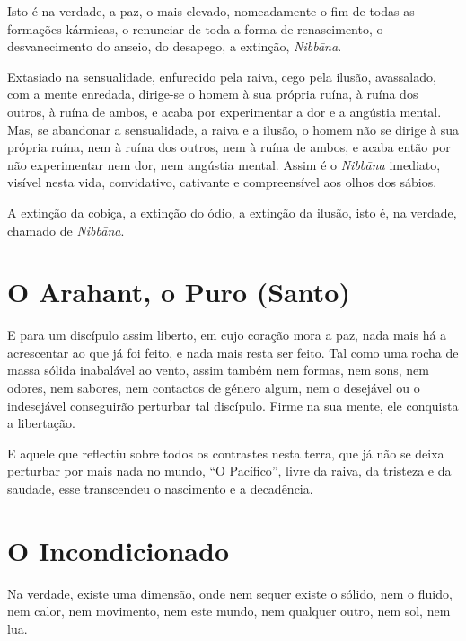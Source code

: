 Isto é na verdade, a paz, o mais elevado, nomeadamente o fim de todas as
formações kármicas, o renunciar de toda a forma de renascimento, o
desvanecimento do anseio, do desapego, a extinção, \emph{Nibbāna}.


Extasiado na sensualidade, enfurecido pela raiva, cego pela ilusão, avassalado,
com a mente enredada, dirige-se o homem à sua própria ruína, à ruína dos outros,
à ruína de ambos, e acaba por experimentar a dor e a angústia mental. Mas, se
abandonar a sensualidade, a raiva e a ilusão, o homem não se dirige à sua
própria ruína, nem à ruína dos outros, nem à ruína de ambos, e acaba então por
não experimentar nem dor, nem angústia mental. Assim é o \emph{Nibbāna}
imediato, visível nesta vida, convidativo, cativante e compreensível aos olhos
dos sábios.


A extinção da cobiça, a extinção do ódio, a extinção da ilusão, isto é, na
verdade, chamado de \emph{Nibbāna}.


\section{O Arahant, o Puro (Santo)}

E para um discípulo assim liberto, em cujo coração mora a paz, nada mais há a
acrescentar ao que já foi feito, e nada mais resta ser feito. Tal como uma rocha
de massa sólida inabalável ao vento, assim também nem formas, nem sons, nem
odores, nem sabores, nem contactos de género algum, nem o desejável ou o
indesejável conseguirão perturbar tal discípulo. Firme na sua mente, ele
conquista a libertação.


E aquele que reflectiu sobre todos os contrastes nesta terra, que já não se
deixa perturbar por mais nada no mundo, ``O Pacífico'', livre da raiva, da
tristeza e da saudade, esse transcendeu o nascimento e a decadência.


\section{O Incondicionado}

Na verdade, existe uma dimensão, onde nem sequer existe o sólido, nem o fluido,
nem calor, nem movimento, nem este mundo, nem qualquer outro, nem sol, nem lua.

